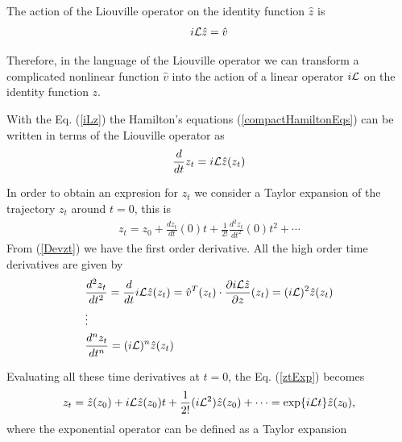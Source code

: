 \documentclass[b5paper,openright,11pt]{book}
\begin{document}

The action of the Liouville operator on the identity function $\hat{z}$ is
\begin{align}
  i{\cal L} \hat{z} = \hat{v}
  \label{iLz}
\end{align}

Therefore, in the language of the Liouville operator we can transform a complicated nonlinear function $\hat{v}$ into the action of a linear operator $i{\cal L}$ on the identity function $z$.

With the Eq. (\ref{iLz}) the Hamilton's equations (\ref{compactHamiltonEqs}) can be written in terms of the Liouville operator as
\begin{align}
  \frac{d}{dt}z_t=i{\cal L}\hat{z}(z_t)
  \label{Devzt}
\end{align}

In order to obtain an expresion for $z_t$ we consider a Taylor expansion of the trajectory $z_t$ around $t=0$, this is
\begin{align}
    z_t=z_0+\frac{dz_t}{dt}(0)t+\frac{1}{2!}\frac{d^2z_t}{dt^2}(0)t^2+\cdots
    \label{ztExp}
\end{align}
From (\ref{Devzt}) we have the first order derivative. All the high order time derivatives are given by
\begin{align}
    &\frac{d^2z_t}{dt^2} = \frac{d}{dt}i{\cal L}\hat{z}(z_t)
    =\hat{v}^T(z_t)\cdot\frac{\partial i{\cal L}\hat{z}}{\partial z}(z_t)
    =(i{\cal L})^2\hat{z}(z_t) \nonumber \\ 
    &\vdots \nonumber \\ 
    &\frac{d^n z_t}{dt^n} =(i{\cal L})^n\hat{z}(z_t)
\end{align}

Evaluating all these time derivatives at $t=0$, the Eq. (\ref{ztExp}) becomes
\begin{align}
    z_t=\hat{z}(z_0)+i{\cal L}\hat{z}(z_0)t
    +\frac{1}{2!}(i{\cal L}^2)\hat{z}(z_0)
    +\cdots
    ={\rm exp}\{i{\cal L}t\}\hat{z}(z_0),
    \label{zt1}
\end{align}
where the exponential operator can be defined as a Taylor expansion
\end{document}
